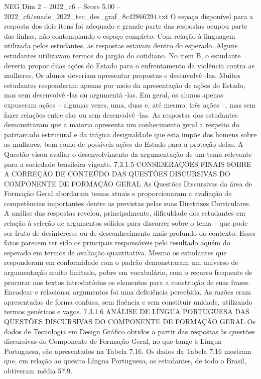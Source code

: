 \begin{textsample}{NEG Dim 2 – 2022\_c6 – Score 5.00 – 2022\_c6/enade\_2022\_tec\_des\_graf\_8c42866294.txt}
O espaço disponível para a resposta dos dois itens foi adequado e grande parte das respostas ocupou parte das linhas, não contemplando o espaço completo.
Com relação à linguagem utilizada pelos estudantes, as respostas estavam dentro do esperado.
Alguns estudantes utilizavam termos do jargão do cotidiano.
No item B, o estudante deveria propor duas ações do Estado para o enfrentamento da violência contra as mulheres.
Os alunos deveriam apresentar propostas e desenvolvê -las.
Muitos estudantes responderam apenas por meio da apresentação de ações do Estado, mas sem desenvolvê -las ou argumentá -las.
Em geral, os alunos apenas expuseram ações – algumas vezes, uma, duas e, até mesmo, três ações –, mas sem fazer relações entre elas ou sem desenvolvê -las.
As respostas dos estudantes demonstraram que a maioria apresenta um conhecimento geral a respeito do patriarcado estrutural e da trágica desigualdade que esta impõe dos homens sobre as mulheres, bem como de possíveis ações do Estado para a proteção delas.
A Questão visou avaliar o desenvolvimento da argumentação de um tema relevante para a sociedade brasileira vigente. 7.3.1.5 CONSIDERAÇÕES FINAIS SOBRE A CORREÇÃO DE CONTEÚDO DAS QUESTÕES DISCURSIVAS DO COMPONENTE DE FORMAÇÃO GERAL As Questões Discursivas da área de Formação Geral abordaram temas atuais e proporcionaram a avaliação de competências importantes dentre as previstas pelas suas Diretrizes Curriculares.
A análise das respostas revelou, principalmente, dificuldade dos estudantes em relação à seleção de argumentos sólidos para discorrer sobre o tema – que pode ser fruto de desinteresse ou de desconhecimento mais profundo do contexto.
Esses fatos parecem ter sido os principais responsáveis pelo resultado aquém do esperado em termos de avaliação quantitativa.
Mesmo os estudantes que responderam em conformidade com o padrão demonstraram um universo de argumentação muito limitado, pobre em vocabulário, com o recurso frequente de procurar nos textos introdutórios os elementos para a construção de suas frases.
Encadear e relacionar argumentos foi uma deficiência percebida.
As razões eram apresentadas de forma confusa, sem fluência e sem constituir unidade, utilizando termos genéricos e vagos. 7.3.1.6 ANÁLISE DE LÍNGUA PORTUGUESA DAS QUESTÕES DISCURSIVAS DO COMPONENTE DE FORMAÇÃO GERAL Os dados de Tecnologia em Design Gráfico obtidos a partir das respostas às questões discursivas do Componente de Formação Geral, no que tange à Língua Portuguesa, são apresentados na Tabela 7.16.
Os dados da Tabela 7.16 mostram que, em relação ao quesito Língua Portuguesa, os estudantes, de todo o Brasil, obtiveram média 57,9.

\end{textsample}
